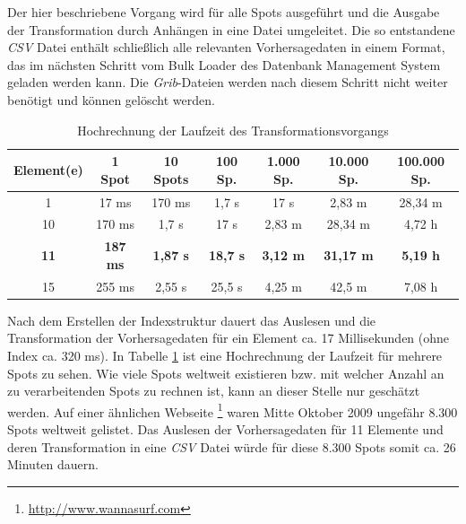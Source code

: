 

Der hier beschriebene Vorgang wird für alle Spots ausgeführt und die
Ausgabe der Transformation durch Anhängen in eine Datei
umgeleitet. Die so entstandene \textit{CSV} Datei enthält schließlich
alle relevanten Vorhersagedaten in einem Format, das im nächsten
Schritt vom Bulk Loader des Datenbank Management System geladen werden
kann. Die \textit{Grib}-Dateien werden nach diesem Schritt nicht
weiter benötigt und können gelöscht werden.
\begin{table}[h]
  \centering
  {\sf
    \footnotesize
    \begin{longtable}{c|c|c|c|c|c|c}

      \toprule
      \textbf{Element(e)} & \textbf{1 Spot} & \textbf{10 Spots} & \textbf{100 Sp.} & \textbf{1.000 Sp.} & \textbf{10.000 Sp.} & \textbf{100.000 Sp.} \\
      \midrule
      1 & 17 ms & 170 ms & 1,7 s & 17 s & 2,83 m & 28,34 m \\
      10 & 170 ms & 1,7 s & 17 s & 2,83 m & 28,34 m & 4,72 h \\
      \textbf{11} & \textbf{187 ms} &  \textbf{1,87 s} & \textbf{18,7 s} & \textbf{3,12 m} & \textbf{31,17 m} & \textbf{5,19 h} \\
      15 & 255 ms & 2,55 s & 25,5 s & 4,25 m & 42,5 m &  7,08 h\\
      \bottomrule
    \end{longtable}
  }

  \caption{Hochrechnung der Laufzeit des Transformationsvorgangs}
  \label{tab:transformation_laufzeit}

\end{table}

Nach dem Erstellen der Indexstruktur dauert das Auslesen und die
Transformation der Vorhersagedaten für ein Element ca. 17
Millisekunden (ohne Index ca. 320 ms). In Tabelle
\ref{tab:transformation_laufzeit} ist eine Hochrechnung der Laufzeit
für mehrere Spots zu sehen. Wie viele Spots weltweit existieren
bzw. mit welcher Anzahl an zu verarbeitenden Spots zu rechnen ist,
kann an dieser Stelle nur geschätzt werden. Auf einer ähnlichen
Webseite \footnote{\url{http://www.wannasurf.com}} waren Mitte Oktober
2009 ungefähr 8.300 Spots weltweit gelistet. Das Auslesen der
Vorhersagedaten für 11 Elemente und deren Transformation in eine
\textit{CSV} Datei würde für diese 8.300 Spots somit ca. 26 Minuten
dauern.

